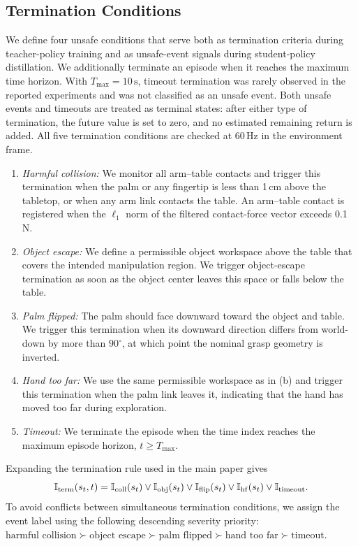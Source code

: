 \subsection{Termination Conditions}
We define four unsafe conditions that serve both as termination criteria during teacher-policy training and as unsafe-event signals during student-policy distillation. We additionally terminate an episode when it reaches the maximum time horizon. With $T_{\max}=10\,\mathrm{s}$, timeout termination was rarely observed in the reported experiments and was not classified as an unsafe event. Both unsafe events and timeouts are treated as terminal states: after either type of termination, the future value is set to zero, and no estimated remaining return is added. All five termination conditions are checked at \(60\,\text{Hz}\) in the environment frame.

\begin{enumerate}[label=(\alph*),leftmargin=2em,itemsep=2pt,topsep=3pt]
  \item \emph{Harmful collision:} We monitor all arm--table contacts and
  trigger this termination when the palm or any fingertip is less than
  1\,cm above the tabletop, or when any arm link contacts the table. An arm--table contact
  is registered when the $\ell_1$ norm of the filtered contact-force vector
  exceeds 0.1 N.
  \item \emph{Object escape:} We define a permissible object workspace above
  the table that covers the intended manipulation region.  We trigger
  object-escape termination as soon as the object center leaves this space or
  falls below the table.
  \item \emph{Palm flipped:} The palm should face downward toward the object and
  table.  We trigger this termination when its downward direction differs from
  world-down by more than $90^\circ$, at which point the nominal grasp geometry
  is inverted.
  \item \emph{Hand too far:} We use the same permissible workspace as in (b)
  and trigger this termination when the palm link leaves it, indicating that
  the hand has moved too far during exploration.
  \item \emph{Timeout:} We terminate the episode when the time index reaches
  the maximum episode horizon, $t\geq T_{\max}$.
\end{enumerate}
Expanding the termination rule used in the main paper gives
\[
\mathbb I_{\rm term}(s_t,t)
=\mathbb I_{\rm coll}(s_t)\lor\mathbb I_{\rm obj}(s_t)
 \lor\mathbb I_{\rm flip}(s_t)\lor\mathbb I_{\rm hf}(s_t)
 \lor\mathbb I_{\rm timeout}.
\]
To avoid conflicts between simultaneous termination conditions, we assign the
event label using the following descending severity priority:
$\text{harmful collision}\succ\text{object escape}\succ\text{palm flipped}
\succ\text{hand too far}\succ\text{timeout}$.

